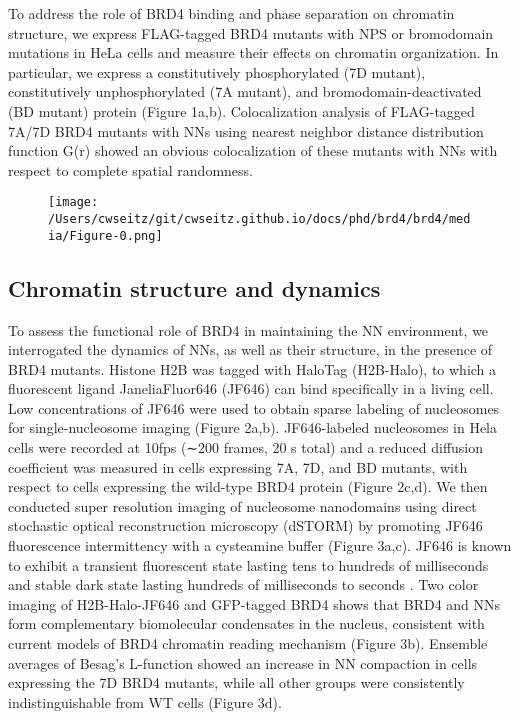 To address the role of BRD4 binding and phase separation on chromatin structure, we express FLAG-tagged BRD4 mutants with NPS or bromodomain mutations in HeLa cells and measure their effects on chromatin organization. In particular, we express a constitutively phosphorylated (7D mutant), constitutively unphosphorylated (7A mutant), and bromodomain-deactivated (BD mutant) protein (Figure 1a,b). Colocalization analysis of FLAG-tagged 7A/7D BRD4 mutants with NNs using nearest neighbor distance distribution function G(r) showed an obvious colocalization of these mutants with NNs with respect to complete spatial randomness. 

\begin{figure}[t]
\texttt{[image: /Users/cwseitz/git/cwseitz.github.io/docs/phd/brd4/brd4/media/Figure-0.png]}
\caption{}
\end{figure}
	
\subsection{Chromatin structure and dynamics}

To assess the functional role of BRD4 in maintaining the NN environment, we interrogated the dynamics of NNs, as well as their structure, in the presence of BRD4 mutants. Histone H2B was tagged with HaloTag \parencite{Los2008} (H2B-Halo), to which a fluorescent ligand JaneliaFluor646 (JF646) can bind speciﬁcally in a living cell. Low concentrations of JF646 were used to obtain sparse labeling of nucleosomes for single-nucleosome imaging (Figure 2a,b). JF646-labeled nucleosomes in Hela cells were recorded at 10fps (∼200 frames, 20 s total) and a reduced diffusion coefficient was measured in cells expressing 7A, 7D, and BD mutants, with respect to cells expressing the wild-type BRD4 protein (Figure 2c,d). We then conducted super resolution imaging of nucleosome nanodomains using direct stochastic optical reconstruction microscopy (dSTORM) by promoting JF646 fluorescence intermittency with a cysteamine buffer (Figure 3a,c). JF646 is known to exhibit a transient fluorescent state lasting tens to hundreds of milliseconds and stable dark state lasting hundreds of milliseconds to seconds \parencite{Grimm2015}. Two color imaging of H2B-Halo-JF646 and GFP-tagged BRD4 shows that BRD4 and NNs form complementary biomolecular condensates in the nucleus, consistent with current models of BRD4 chromatin reading mechanism (Figure 3b). Ensemble averages of Besag’s L-function showed an increase in NN compaction in cells expressing the 7D BRD4 mutants, while all other groups were consistently indistinguishable from WT cells (Figure 3d).  

